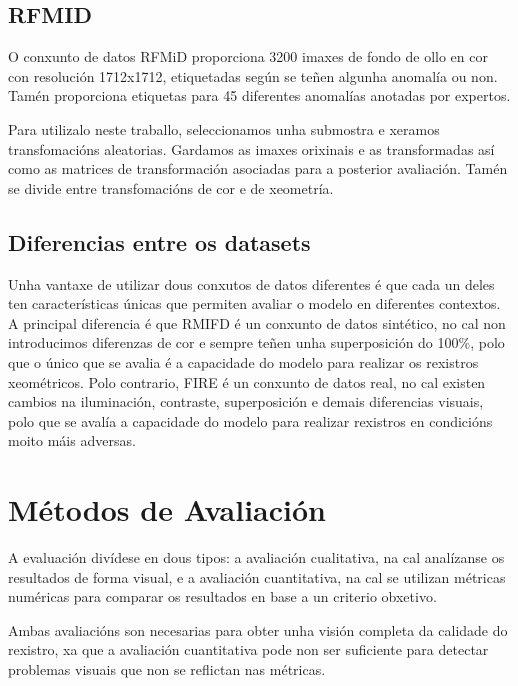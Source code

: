 \subsection{RFMID}
\label{subsec:RFMID}

O conxunto de datos RFMiD \cite{RFMiD} proporciona 3200 imaxes de fondo de ollo en cor con resolución 1712x1712, etiquetadas según se teñen algunha anomalía ou non. 
Tamén proporciona etiquetas para 45 diferentes anomalías anotadas por expertos.

Para utilizalo neste traballo, seleccionamos unha submostra e xeramos transfomacións aleatorias. Gardamos as imaxes orixinais e as transformadas así como as matrices de transformación asociadas para a posterior avaliación.
Tamén se divide entre transfomacións de cor e de xeometría.



\subsection{Diferencias entre os datasets}
\label{subsec:Diferencias entre os datasets}

Unha vantaxe de utilizar dous conxutos de datos diferentes é que cada un deles ten características únicas que permiten avaliar o modelo en diferentes contextos.
A principal diferencia é que RMIFD é un conxunto de datos sintético, no cal non introducimos diferenzas de cor e sempre teñen unha superposición do 100\%, polo que o único que se avalia é a capacidade do modelo para realizar os rexistros xeométricos.
Polo contrario, FIRE é un conxunto de datos real, no cal existen cambios na iluminación, contraste, superposición e demais diferencias visuais, polo que se avalía a capacidade do modelo para realizar rexistros en condicións moito máis adversas.

\section{Métodos de Avaliación}
\label{sec:Métodos de Avaliación}

A evaluación divídese en dous tipos: a avaliación cualitativa, na cal analízanse os resultados de forma visual,
 e a avaliación cuantitativa, na cal se utilizan métricas numéricas para comparar os resultados en base a un criterio obxetivo.

 Ambas avaliacións son necesarias para obter unha visión completa da calidade do rexistro, xa que a avaliación cuantitativa pode non ser suficiente para detectar problemas visuais que non se reflictan nas métricas.

